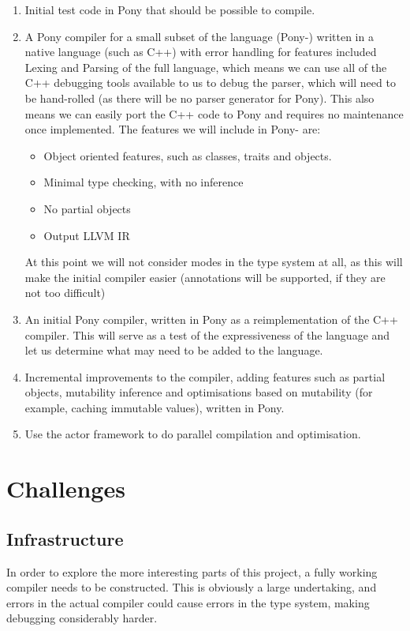 \documentclass[11pt,a4paper]{report}
\begin{document}
\begin{enumerate}
	\item Initial test code in Pony that should be possible to compile.
	\item A Pony compiler for a small subset of the language (Pony-) written in a native language (such as C++) with error handling for features included
		Lexing and Parsing of the full language, which means we can use all of the C++ debugging tools available to us to debug the parser, which will need to be hand-rolled (as there will be no parser generator for Pony).
		This also means we can easily port the C++ code to Pony and requires no maintenance once implemented.
		The features we will include in Pony- are:
		\begin{itemize}[noitemsep]
			\item Object oriented features, such as classes, traits and objects.
			\item Minimal type checking, with no inference
			\item No partial objects
			\item Output LLVM IR
		\end{itemize}
	At this point we will not consider modes in the type system at all, as this will make the initial compiler easier (annotations will be supported, if they are not too difficult)
	\item An initial Pony compiler, written in Pony as a reimplementation of the C++ compiler.
		This will serve as a test of the expressiveness of the language and let us determine what may need to be added to the language.
	\item Incremental improvements to the compiler, adding features such as partial objects, mutability inference and optimisations based on mutability (for example, caching immutable values), written in Pony.
    	\item Use the actor framework to do parallel compilation and optimisation.
\end{enumerate}

\section{Challenges}

\subsection{Infrastructure}

In order to explore the more interesting parts of this project, a fully working compiler needs to be constructed.
This is obviously a large undertaking, and errors in the actual compiler could cause errors in the type system, making debugging considerably harder.
\end{document}
